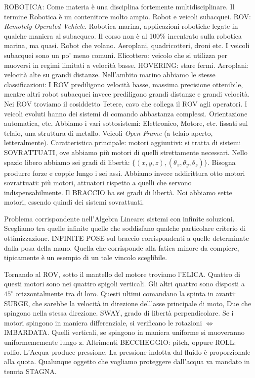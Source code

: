 ROBOTICA: Come materia è una disciplina fortemente multidisciplinare. Il termine Robotica è un contenitore molto ampio. Robot e veicoli subacquei. ROV: \textit{Remotely Operated Vehicle}. Robotica marina, applicazioni robotiche legate in qualche maniera al subacqueo. Il corso non è al 100\% incentrato sulla robotica marina, ma quasi. Robot che volano. Aeroplani, quadricotteri, droni etc. I veicoli subacquei sono un po' meno comuni. Elicottero: veicolo che si utilizza per muoversi in regimi limitati a velocità basse. HOVERING: stare fermi. Aeroplani: velocità alte su grandi distanze. Nell'ambito marino abbiamo le stesse classificazioni: I ROV prediligono velocità basse, massima precisione ottenibile, mentre altri robot subacquei invece prediligono grandi distanze e grandi velocità. Nei ROV troviamo il cosiddetto Tetere, cavo che collega il ROV agli operatori. I veicoli evoluti hanno dei sistemi di comando abbastanza complessi. Orientazione automatica, etc. Abbiamo i vari sottosistemi: Elettronico, Motore, etc. fissati sul telaio, una struttura di metallo. Veicoli \textit{Open-Frame} (a telaio aperto, letteralmente). Caratteristica principale: motori aggiuntivi: si tratta di sistemi SOVRATTUATI, ove abbiamo più motori di quelli strettamente necessari. Nello spazio libero abbiamo sei gradi di libertà: $\{(x,y,z),(\theta_x,\theta_y,\theta_z)\}$. Bisogna produrre forze e coppie lungo i sei assi. Abbiamo invece addirittura otto motori sovrattuati: più motori, attuatori rispetto a quelli che servono indispensabilmente. Il BRACCIO ha sei gradi di libertà. Noi abbiamo sette motori, essendo quindi dei sistemi sovrattuati.

Problema corrispondente nell'Algebra Lineare: sistemi con infinite soluzioni. Scegliamo tra quelle infinite quelle che soddisfano qualche particolare criterio di ottimizzazione. INFINITE POSE sul braccio corrispondenti a quelle determinate dalla posa della mano. Quella che corrisponde alla fatica minore da compiere, tipicamente è un esempio di un tale vincolo sceglibile.

Tornando al ROV, sotto il mantello del motore troviamo l'ELICA. Quattro di questi motori sono nei quattro spigoli verticali. Gli altri quattro sono disposti a $45^{\circ}$ orizzontalmente tra di loro. Questi ultimi comandano la spinta in avanti: SURGE, che sarebbe la velocità in direzione dell'asse principale di moto, Due che spingono nella stessa direzione. SWAY, grado di libertà perpendicolare. Se i motori spingono in maniera differenziale, si verificano le rotazioni $\iff$ IMBARDATA. Quelli verticali, se spingono in maniera uniforme si muoveranno uniformememente lungo z. Altrimenti BECCHEGGIO: pitch, oppure ROLL: rollio. L'Acqua produce pressione. La pressione indotta dal fluido è proporzionale alla quota. Qualunque oggetto che vogliamo proteggere dall'acqua va mandato in tenuta STAGNA.


